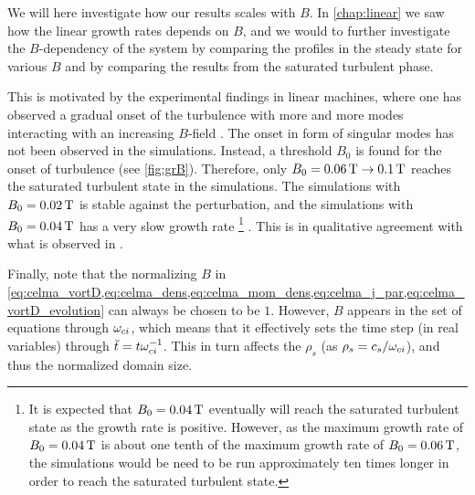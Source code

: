 %
We will here investigate how our results scales with $B$.
In \cref{chap:linear} we saw how the linear growth rates depends on $B$, and we would to further investigate the $B$-dependency of the system by comparing the profiles in the steady state for various $B$ and by comparing the results from the saturated turbulent phase.

This is motivated by the experimental findings in linear machines, where one has observed a gradual onset of the turbulence with more and more modes interacting with an increasing $B$-field \cite{Klinger1997,Klinger1997a,Burin2005}.
The onset in form of singular modes has not been observed in the simulations.
Instead, a threshold $B_0$ is found for the onset of turbulence (see \cref{fig:grB}).
Therefore, only $B_0 = 0.06\, \text{T} \to 0.1\, \text{T}$ reaches the saturated turbulent state in the simulations.
The simulations with $B_0 = 0.02\, \text{T}$ is stable against the perturbation, and the simulations with $B_0 = 0.04\, \text{T}$ has a very slow growth rate%
\footnote{It is expected that $B_0=0.04\, \text{T}$ eventually will reach the saturated turbulent state as the growth rate is positive.
    However, as the maximum growth rate of $B_0=0.04\, \text{T}$ is about one tenth of the maximum growth rate of $B_0=0.06\, \text{T}$, the simulations would be need to be run approximately ten times longer in order to reach the saturated turbulent state.
}
%
.
This is in qualitative agreement with what is observed in \cite{Burin2005}.

Finally, note that the normalizing $B$ in \cref{eq:celma_vortD,eq:celma_dens,eq:celma_mom_dens,eq:celma_j_par,eq:celma_vortD_evolution} can always be chosen to be $1$.
However, $B$ appears in the set of equations through $\omega_{ci}$, which means that it effectively sets the time step (in real variables) through $\breve{t}=t\omega_{ci}^{-1}$.
This in turn affects the $\rho_s$ (as $\rho_s=c_s/\omega_{ci}$), and thus the normalized domain size.

